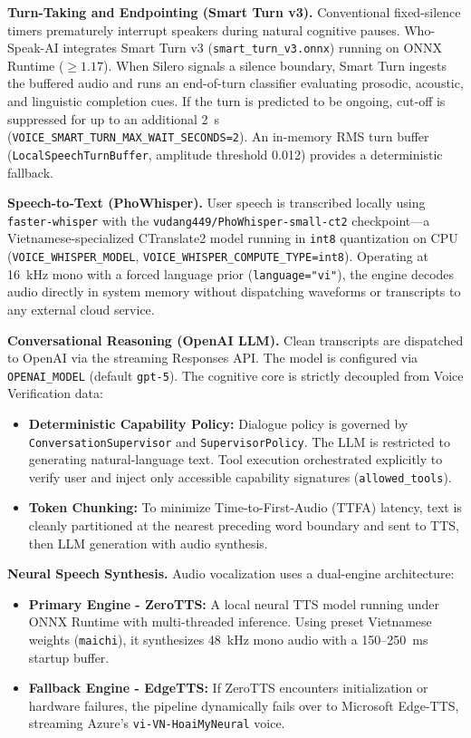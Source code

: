 \textbf{Turn-Taking and Endpointing (Smart Turn v3).} Conventional fixed-silence timers prematurely interrupt speakers during natural cognitive pauses. Who-Speak-AI integrates Smart Turn v3 (\texttt{smart\_turn\_v3.onnx}) running on ONNX Runtime ($\ge 1.17$). When Silero signals a silence boundary, Smart Turn ingests the buffered audio and runs an end-of-turn classifier evaluating prosodic, acoustic, and linguistic completion cues. If the turn is predicted to be ongoing, cut-off is suppressed for up to an additional 2~s (\texttt{VOICE\_SMART\_TURN\_MAX\_WAIT\_SECONDS=2}). An in-memory RMS turn buffer (\texttt{LocalSpeechTurnBuffer}, amplitude threshold 0.012) provides a deterministic fallback.

\textbf{Speech-to-Text (PhoWhisper).} User speech is transcribed locally using \texttt{faster-whisper} with the \texttt{vudang449/\allowbreak PhoWhisper-small-ct2} checkpoint---a Vietnamese-specialized CTranslate2 model running in \texttt{int8} quantization on CPU (\texttt{VOICE\_WHISPER\_MODEL}, \texttt{VOICE\_WHISPER\_COMPUTE\_TYPE=int8}). Operating at 16~kHz mono with a forced language prior (\texttt{language="vi"}), the engine decodes audio directly in system memory without dispatching waveforms or transcripts to any external cloud service.

\textbf{Conversational Reasoning (OpenAI LLM).} Clean transcripts are dispatched to OpenAI via the streaming Responses API. The model is configured via \texttt{OPENAI\_MODEL} (default \texttt{gpt-5}). The cognitive core is strictly decoupled from Voice Verification data:
\begin{itemize}
    \item \textbf{Deterministic Capability Policy:} Dialogue policy is governed by \texttt{ConversationSupervisor} and \texttt{SupervisorPolicy}. The LLM is restricted to generating natural-language text. Tool execution orchestrated explicitly to verify user and inject only accessible capability signatures (\texttt{allowed\_tools}).
    \item \textbf{Token Chunking:} To minimize Time-to-First-Audio (TTFA) latency, text is cleanly partitioned at the nearest preceding word boundary and sent to TTS, then LLM generation with audio synthesis.
\end{itemize}

\textbf{Neural Speech Synthesis.} Audio vocalization uses a dual-engine architecture:
\begin{itemize}
    \item \textbf{Primary Engine - ZeroTTS:} A local neural TTS model running under ONNX Runtime with multi-threaded inference. Using preset Vietnamese weights (\texttt{maichi}), it synthesizes 48~kHz mono audio with a 150--250~ms startup buffer.
    \item \textbf{Fallback Engine - EdgeTTS:} If ZeroTTS encounters initialization or hardware failures, the pipeline dynamically fails over to Microsoft Edge-TTS, streaming Azure's {\texttt{vi-VN-HoaiMyNeural}} voice.
\end{itemize}

